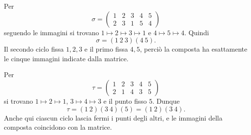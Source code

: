 \begin{esempio}
Per
\[
\sigma=\begin{pmatrix}1&2&3&4&5\\2&3&1&5&4\end{pmatrix}
\]
seguendo le immagini si trovano $1\mapsto2\mapsto3\mapsto1$ e $4\mapsto5\mapsto4$. Quindi
\[
\sigma=(1\ 2\ 3)(4\ 5).
\]
Il secondo ciclo fissa $1,2,3$ e il primo fissa $4,5$, perciò la composta ha esattamente le cinque immagini indicate dalla matrice.

Per
\[
\tau=\begin{pmatrix}1&2&3&4&5\\2&1&4&3&5\end{pmatrix}
\]
si trovano $1\mapsto2\mapsto1$, $3\mapsto4\mapsto3$ e il punto fisso $5$. Dunque
\[
\tau=(1\ 2)(3\ 4)(5)=(1\ 2)(3\ 4).
\]
Anche qui ciascun ciclo lascia fermi i punti degli altri, e le immagini della composta coincidono con la matrice.
\end{esempio}

